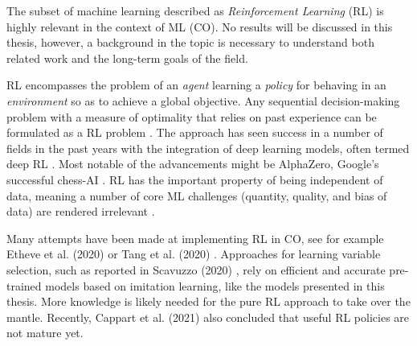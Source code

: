 The subset of machine learning described as \textit{Reinforcement Learning} (\gls{RL}) is highly relevant in the context of \gls{ML} (\gls{CO}). No results will be discussed in this thesis, however, a background in the topic is necessary to understand both related work and the long-term goals of the field.

\gls{RL} encompasses the problem of an \textit{agent} learning a \textit{policy} for behaving in an \textit{environment} so as to achieve a global objective. Any sequential decision-making problem with a measure of optimality that relies on past experience can be formulated as a \gls{RL} problem \cite{francois2018introduction}. The approach has seen success in a number of fields in the past years with the integration of deep learning models, often termed deep \gls{RL} \cite{francois2018introduction}. Most notable of the advancements might be AlphaZero, Google's successful chess-AI \cite{silver2017mastering}. \gls{RL} has the important property of being independent of data, meaning a number of core \gls{ML} challenges (quantity, quality, and bias of data) are rendered irrelevant \cite{goodfellow2016deep}. 


Many attempts have been made at implementing \gls{RL} in \gls{CO}, see for example Etheve et al. (2020) \cite{etheve2020reinforcement} or Tang et al. (2020) \cite{tang2020reinforcement}. Approaches for learning variable selection, such as reported in Scavuzzo (2020) \cite{scavuzzo2020learning}, rely on efficient and accurate pre-trained models based on imitation learning, like the models presented in this thesis. More knowledge is likely needed for the pure \gls{RL} approach to take over the mantle. Recently,
Cappart et al. (2021) \cite{cappart2021combinatorial} also concluded that useful \gls{RL} policies are not mature yet. 
